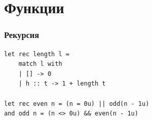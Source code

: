 \documentclass{../../slides-style}
\begin{document}
    \section{Функции}

    \begin{frame}[fragile]
        \frametitle{Рекурсия}
        \begin{verbatim}
let rec length l =
    match l with
    | [] -> 0
    | h :: t -> 1 + length t

let rec even n = (n = 0u) || odd(n - 1u)
and odd n = (n <> 0u) && even(n - 1u)
        \end{verbatim}
    \end{frame}
\end{document}
